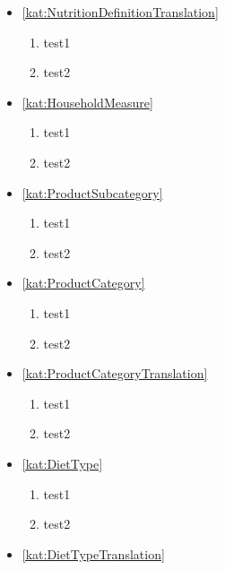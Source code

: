 \begin{itemize}[label={\textbf{Ograniczenia dla}}, wide, labelwidth=!, labelindent=0pt]
    \item\ref{kat:NutritionDefinitionTranslation}
    \begin{enumerate}[label={\textbf{OGR/\protect\threedigits{\arabic{enumi}}}}, wide, labelwidth=!, resume]
        \item test1
        \item test2
    \end{enumerate}
    \item\ref{kat:HouseholdMeasure}
    \begin{enumerate}[label={\textbf{OGR/\protect\threedigits{\arabic{enumi}}}}, wide, labelwidth=!, resume]
        \item test1
        \item test2
    \end{enumerate}
    \item\ref{kat:ProductSubcategory}
    \begin{enumerate}[label={\textbf{OGR/\protect\threedigits{\arabic{enumi}}}}, wide, labelwidth=!, resume]
        \item test1
        \item test2
    \end{enumerate}
    \item\ref{kat:ProductCategory}
    \begin{enumerate}[label={\textbf{OGR/\protect\threedigits{\arabic{enumi}}}}, wide, labelwidth=!, resume]
        \item test1
        \item test2
    \end{enumerate}
    \item\ref{kat:ProductCategoryTranslation}
    \begin{enumerate}[label={\textbf{OGR/\protect\threedigits{\arabic{enumi}}}}, wide, labelwidth=!, resume]
        \item test1
        \item test2
    \end{enumerate}
    \item\ref{kat:DietType}
    \begin{enumerate}[label={\textbf{OGR/\protect\threedigits{\arabic{enumi}}}}, wide, labelwidth=!, resume]
        \item test1
        \item test2
    \end{enumerate}
    \item\ref{kat:DietTypeTranslation}
    \begin{enumerate}[label={\textbf{OGR/\protect\threedigits{\arabic{enumi}}}}, wide, labelwidth=!, resume]

\end{enumerate}
\end{itemize}

